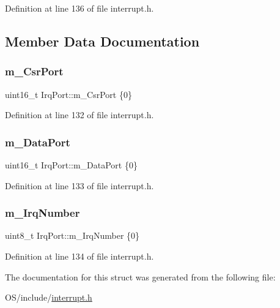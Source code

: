 Definition at line 136 of file interrupt.\+h.



\subsection{Member Data Documentation}
\mbox{\label{struct_irq_port_a5ac1b74e9c140c3ea39a69cd7188b828}} 
\subsubsection{\texorpdfstring{m\+\_\+\+Csr\+Port}{m\_CsrPort}}
{\footnotesize\ttfamily uint16\+\_\+t Irq\+Port\+::m\+\_\+\+Csr\+Port \{0\}}



Definition at line 132 of file interrupt.\+h.

\mbox{\label{struct_irq_port_ae3faad3d02d2b4e1d7955fc46d946470}} 
\subsubsection{\texorpdfstring{m\+\_\+\+Data\+Port}{m\_DataPort}}
{\footnotesize\ttfamily uint16\+\_\+t Irq\+Port\+::m\+\_\+\+Data\+Port \{0\}}



Definition at line 133 of file interrupt.\+h.

\mbox{\label{struct_irq_port_a73a87471680527ab85f05b708c375fe7}} 
\subsubsection{\texorpdfstring{m\+\_\+\+Irq\+Number}{m\_IrqNumber}}
{\footnotesize\ttfamily uint8\+\_\+t Irq\+Port\+::m\+\_\+\+Irq\+Number \{0\}}



Definition at line 134 of file interrupt.\+h.



The documentation for this struct was generated from the following file\+:\begin{DoxyCompactItemize}
\item 
O\+S/include/\hyperlink{interrupt_8h}{interrupt.\+h}\end{DoxyCompactItemize}
